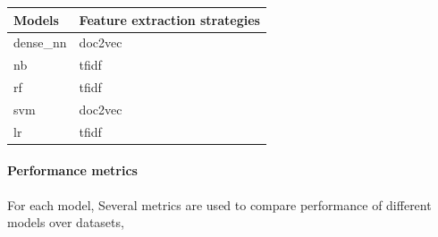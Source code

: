 \documentclass[
]{article}
\begin{document}
\begin{tabular}{ll}
\toprule
Models & Feature extraction strategies\\
\midrule
dense\_nn & doc2vec\\
nb & tfidf\\
rf & tfidf\\
svm & doc2vec\\
lr & tfidf\\
\bottomrule
\end{tabular}

\hypertarget{performance-metrics}{%
\paragraph{Performance metrics}\label{performance-metrics}}

For each model, Several metrics are used to compare performance of
different models over datasets,
\end{document}
